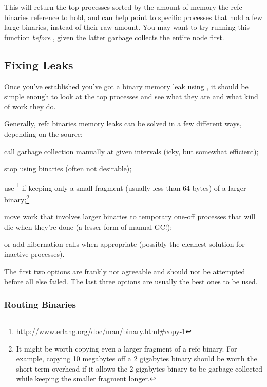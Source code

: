 \documentclass[11pt, oneside]{book}   	%
\begin{document}
This will return the  top processes sorted by the amount of memory the refc binaries reference to hold, and can help point to specific processes that hold a few large binaries, instead of their raw amount. You may want to try running this function \emph{before} , given the latter garbage collects the entire node first.

\subsection{Fixing Leaks}

Once you've established you've got a binary memory leak using , it should be simple enough to look at the top processes and see what they are and what kind of work they do.

Generally, refc binaries memory leaks can be solved in a few different ways, depending on the source:

\begin{itemize*}
	\item call garbage collection manually at given intervals (icky, but somewhat efficient);
	\item stop using binaries (often not desirable);
	\item use \footnote{\href{http://www.erlang.org/doc/man/binary.html\#copy-1}{http://www.erlang.org/doc/man/binary.html\#copy-1}} if keeping only a small fragment (usually less than 64 bytes) of a larger binary;\footnote{It might be worth copying even a larger fragment of a refc binary. For example, copying 10 megabytes off a 2 gigabytes binary should be worth the short-term overhead if it allows the 2 gigabytes binary to be garbage-collected while keeping the smaller fragment longer.}
	\item move work that involves larger binaries to temporary one-off processes that will die when they're done (a lesser form of manual GC!);
	\item or add hibernation calls when appropriate (possibly the cleanest solution for inactive processes).
\end{itemize*}

The first two options are frankly not agreeable and should not be attempted before all else failed. The last three options are usually the best ones to be used.

\subsubsection{Routing Binaries}
\end{document}
